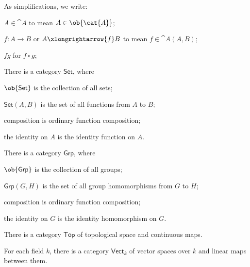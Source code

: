 \begin{remark}
  As simplifications, we write:
  \begin{enumalph}
    \item $A \in \cat{A}$ to mean $A \in \ob{\cat{A}}$;
    \item $f : A \to B$ or $A \xlongrightarrow{f} B$ to mean
      $f \in \cat{A}(A,B)$;
    \item $fg$ for $f \circ g$;
  \end{enumalph}
\end{remark}



\begin{examples}
  
  \begin{enumarabic}
    \item There is a category $\mathsf{Set}$, where
      \begin{enumalph}
        \item $\ob{\mathsf{Set}}$ is the collection of all sets;
        \item $\mathsf{Set}(A,B)$ is the set of all functions from $A$ to $B$;
        \item composition is ordinary function composition;
        \item the identity on $A$ is the identity function on $A$.
      \end{enumalph}
    \item There is a category $\mathsf{Grp}$, where
      \begin{enumalph}
        \item $\ob{\mathsf{Grp}}$ is the collection of all groups;
        \item $\mathsf{Grp}(G,H)$ is the set of all group homomorphisms from $G$ to $H$;
        \item composition is ordinary function composition;
        \item the identity on $G$ is the identity homomorphism on $G$.
      \end{enumalph}
    \item There is a category $\mathsf{Top}$ of topological space and continuous maps.
    \item For each field $k$, there is a category $\mathsf{Vect}_k$ of vector spaces over $k$
      and linear maps between them.
  \end{enumarabic}
\end{examples}


